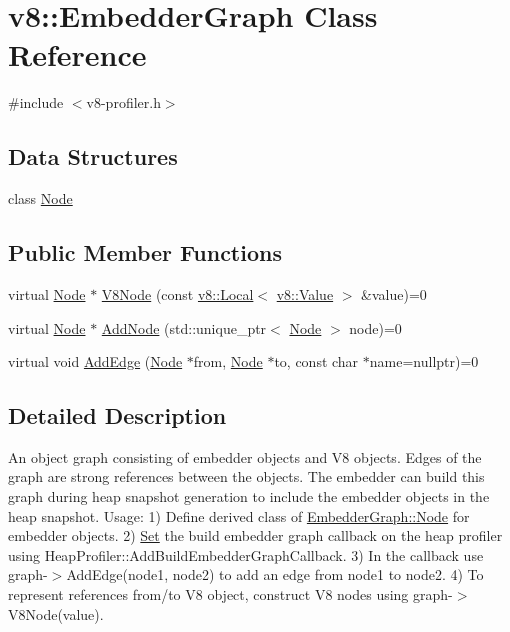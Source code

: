 \hypertarget{classv8_1_1EmbedderGraph}{}\section{v8\+:\+:Embedder\+Graph Class Reference}
\label{classv8_1_1EmbedderGraph}


{\ttfamily \#include $<$v8-\/profiler.\+h$>$}

\subsection*{Data Structures}
\begin{DoxyCompactItemize}
\item 
class \mbox{\hyperlink{classv8_1_1EmbedderGraph_1_1Node}{Node}}
\end{DoxyCompactItemize}
\subsection*{Public Member Functions}
\begin{DoxyCompactItemize}
\item 
virtual \mbox{\hyperlink{classv8_1_1EmbedderGraph_1_1Node}{Node}} $\ast$ \mbox{\hyperlink{classv8_1_1EmbedderGraph_a6fdb5451611738dd44c70d195445d0ff}{V8\+Node}} (const \mbox{\hyperlink{classv8_1_1Local}{v8\+::\+Local}}$<$ \mbox{\hyperlink{classv8_1_1Value}{v8\+::\+Value}} $>$ \&value)=0
\item 
virtual \mbox{\hyperlink{classv8_1_1EmbedderGraph_1_1Node}{Node}} $\ast$ \mbox{\hyperlink{classv8_1_1EmbedderGraph_a57afbce6126e5cd82b66f66b018a18e2}{Add\+Node}} (std\+::unique\+\_\+ptr$<$ \mbox{\hyperlink{classv8_1_1EmbedderGraph_1_1Node}{Node}} $>$ node)=0
\item 
virtual void \mbox{\hyperlink{classv8_1_1EmbedderGraph_a81b1c7dd4d0387ec50037b0778b8af11}{Add\+Edge}} (\mbox{\hyperlink{classv8_1_1EmbedderGraph_1_1Node}{Node}} $\ast$from, \mbox{\hyperlink{classv8_1_1EmbedderGraph_1_1Node}{Node}} $\ast$to, const char $\ast$name=nullptr)=0
\end{DoxyCompactItemize}


\subsection{Detailed Description}
An object graph consisting of embedder objects and V8 objects. Edges of the graph are strong references between the objects. The embedder can build this graph during heap snapshot generation to include the embedder objects in the heap snapshot. Usage\+: 1) Define derived class of \mbox{\hyperlink{classv8_1_1EmbedderGraph_1_1Node}{Embedder\+Graph\+::\+Node}} for embedder objects. 2) \mbox{\hyperlink{classv8_1_1Set}{Set}} the build embedder graph callback on the heap profiler using Heap\+Profiler\+::\+Add\+Build\+Embedder\+Graph\+Callback. 3) In the callback use graph-\/$>$Add\+Edge(node1, node2) to add an edge from node1 to node2. 4) To represent references from/to V8 object, construct V8 nodes using graph-\/$>$V8\+Node(value). 

